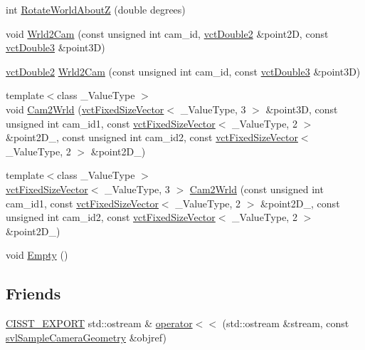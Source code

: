 \begin{DoxyCompactItemize}
int \hyperlink{classsvl_sample_camera_geometry_a0d18a9b4f94e5326ba6fcee374e125dd}{Rotate\-World\-About\-Z} (double degrees)
\item 
void \hyperlink{classsvl_sample_camera_geometry_a536c770ee1d9bdc06b5d885d84782307}{Wrld2\-Cam} (const unsigned int cam\-\_\-id, \hyperlink{vct_fixed_size_vector_types_8h_afc0fdcc41cbe8b043747612501610812}{vct\-Double2} \&point2\-D, const \hyperlink{vct_fixed_size_vector_types_8h_a4a89122c9d7f72c3f31fe8126e17c3af}{vct\-Double3} \&point3\-D)
\item 
\hyperlink{vct_fixed_size_vector_types_8h_afc0fdcc41cbe8b043747612501610812}{vct\-Double2} \hyperlink{classsvl_sample_camera_geometry_a90b13ff843d12de76f791033cd51b0a0}{Wrld2\-Cam} (const unsigned int cam\-\_\-id, const \hyperlink{vct_fixed_size_vector_types_8h_a4a89122c9d7f72c3f31fe8126e17c3af}{vct\-Double3} \&point3\-D)
\item 
{\footnotesize template$<$class \-\_\-\-Value\-Type $>$ }\\void \hyperlink{classsvl_sample_camera_geometry_a70a7fddee2fe2e3867290ae428d5ff2f}{Cam2\-Wrld} (\hyperlink{classvct_fixed_size_vector}{vct\-Fixed\-Size\-Vector}$<$ \-\_\-\-Value\-Type, 3 $>$ \&point3\-D, const unsigned int cam\-\_\-id1, const \hyperlink{classvct_fixed_size_vector}{vct\-Fixed\-Size\-Vector}$<$ \-\_\-\-Value\-Type, 2 $>$ \&point2\-D\-\_, const unsigned int cam\-\_\-id2, const \hyperlink{classvct_fixed_size_vector}{vct\-Fixed\-Size\-Vector}$<$ \-\_\-\-Value\-Type, 2 $>$ \&point2\-D\-\_)
\item 
{\footnotesize template$<$class \-\_\-\-Value\-Type $>$ }\\\hyperlink{classvct_fixed_size_vector}{vct\-Fixed\-Size\-Vector}$<$ \-\_\-\-Value\-Type, 3 $>$ \hyperlink{classsvl_sample_camera_geometry_ad32f9b4fb70ddb49c5c8241d89c861cb}{Cam2\-Wrld} (const unsigned int cam\-\_\-id1, const \hyperlink{classvct_fixed_size_vector}{vct\-Fixed\-Size\-Vector}$<$ \-\_\-\-Value\-Type, 2 $>$ \&point2\-D\-\_, const unsigned int cam\-\_\-id2, const \hyperlink{classvct_fixed_size_vector}{vct\-Fixed\-Size\-Vector}$<$ \-\_\-\-Value\-Type, 2 $>$ \&point2\-D\-\_)
\item 
void \hyperlink{classsvl_sample_camera_geometry_a9877cc52943e73e80159dc4758a505a6}{Empty} ()
\end{DoxyCompactItemize}
\subsection*{Friends}
\begin{DoxyCompactItemize}
\item 
\hyperlink{cmn_export_macros_8h_a99393e0c3ac434b2605235bbe20684f8}{C\-I\-S\-S\-T\-\_\-\-E\-X\-P\-O\-R\-T} std\-::ostream \& \hyperlink{classsvl_sample_camera_geometry_ad223df811cb8caa99fcf544dc1c1a415}{operator$<$$<$} (std\-::ostream \&stream, const \hyperlink{classsvl_sample_camera_geometry}{svl\-Sample\-Camera\-Geometry} \&objref)
\end{DoxyCompactItemize}
